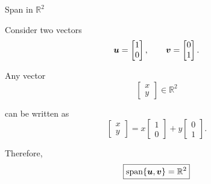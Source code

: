 
\begin{frame}{Span in $\mathbb{R}^2$}

Consider two vectors
\vspace{0.1cm}
\[
\bm{u}
=
\begin{bmatrix}
1\\
0
\end{bmatrix},
\qquad
\bm{v}
=
\begin{bmatrix}
0\\
1
\end{bmatrix}.
\]

Any vector
\vspace{0.1cm}
\[
\begin{bmatrix}
x\\
y
\end{bmatrix}
\in\mathbb{R}^2
\]

can be written as
\vspace{0.1cm}
\[
\begin{bmatrix}
x\\
y
\end{bmatrix}
=
x
\begin{bmatrix}
1\\
0
\end{bmatrix}
+
y
\begin{bmatrix}
0\\
1
\end{bmatrix}.
\]

Therefore,
\vspace{0.1cm}
\[
\boxed{
\operatorname{span}\{\bm{u},\bm{v}\}
=
\mathbb{R}^2
}
\]

\end{frame}



